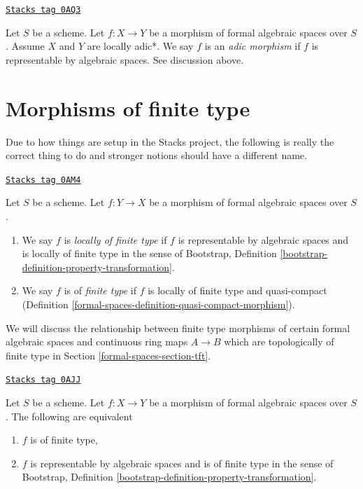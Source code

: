 \begin{definition}
\label{formal-spaces-definition-adic-morphism}
\href{https://stacks.math.columbia.edu/tag/0AQ3}{\texttt{Stacks tag 0AQ3}}

Let $S$ be a scheme. Let $f : X \to Y$ be a morphism of formal algebraic
spaces over $S$. Assume $X$ and $Y$ are locally adic*. We say $f$ is
an {\it adic morphism} if $f$ is representable by algebraic spaces.
See discussion above.
\end{definition}

\section{Morphisms of finite type}
\label{formal-spaces-section-finite-type}
Due to how things are setup in the Stacks project, the following
is really the correct thing to do and stronger notions should have
a different name.

\begin{definition}
\label{formal-spaces-definition-finite-type}
\href{https://stacks.math.columbia.edu/tag/0AM4}{\texttt{Stacks tag 0AM4}}

Let $S$ be a scheme. Let $f : Y \to X$ be a morphism of formal algebraic
spaces over $S$.
\begin{enumerate}
\item We say $f$ is {\it locally of finite type}
if $f$ is representable by algebraic spaces and is locally
of finite type in the sense of
Bootstrap, Definition \ref{bootstrap-definition-property-transformation}.
\item We say $f$ is of {\it finite type} if $f$ is locally of finite type and
quasi-compact (Definition \ref{formal-spaces-definition-quasi-compact-morphism}).
\end{enumerate}
\end{definition}

We will discuss the relationship between finite type morphisms of
certain formal algebraic spaces and
continuous ring maps $A \to B$ which are topologically of finite type
in Section \ref{formal-spaces-section-tft}.

\begin{lemma}
\label{formal-spaces-lemma-characterize-finite-type}
\href{https://stacks.math.columbia.edu/tag/0AJJ}{\texttt{Stacks tag 0AJJ}}

Let $S$ be a scheme. Let $f : X \to Y$ be a morphism of formal algebraic
spaces over $S$. The following are equivalent
\begin{enumerate}
\item $f$ is of finite type,
\item $f$ is representable by algebraic spaces and is of finite type in
the sense of
Bootstrap, Definition \ref{bootstrap-definition-property-transformation}.
\end{enumerate}
\end{lemma}

